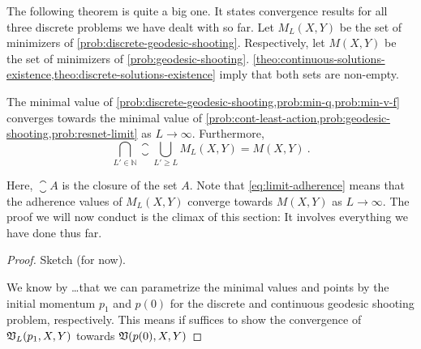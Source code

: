 The following theorem is quite a big one.
It states convergence results for all three discrete problems we have dealt with so far.
Let $M_L(X, Y)$ be the set of minimizers of \cref{prob:discrete-geodesic-shooting}.
Respectively, let $M(X, Y)$ be the set of minimizers of \cref{prob:geodesic-shooting}.
\cref{theo:continuous-solutions-existence,theo:discrete-solutions-existence} imply that both sets are non-empty.
\begin{theorem}
	\label{theo:problem-convergence}
	The minimal value of \cref{prob:discrete-geodesic-shooting,prob:min-q,prob:min-v-f} converges towards the minimal value of \cref{prob:cont-least-action,prob:geodesic-shooting,prob:resnet-limit} as $L \rightarrow \infty$.
	Furthermore,
	\begin{equation}
	\label{eq:limit-adherence}
		\bigcap_{L' \in \mathbb{N}} \closure\bigcup_{L' \geq L} M_L(X, Y) = M(X, Y) \ .
	\end{equation}
\end{theorem}
Here, $\closure A$ is the closure of the set $A$.
Note that \cref{eq:limit-adherence} means that the adherence values of $M_L(X, Y)$ converge towards $M(X, Y)$ as $L \rightarrow \infty$.
The proof we will now conduct is the climax of this section:
It involves everything we have done thus far.
\begin{proof}
	Sketch (for now).
	
	We know by \dots that we can parametrize the minimal values and points by the initial momentum $p_1$ and $p(0)$ for the discrete and continuous geodesic shooting problem, respectively.
	This means if suffices to show the convergence of $\mathfrak{V}_L(p_1, X, Y)$ towards $\mathfrak{V}(p(0), X, Y)$
\end{proof}